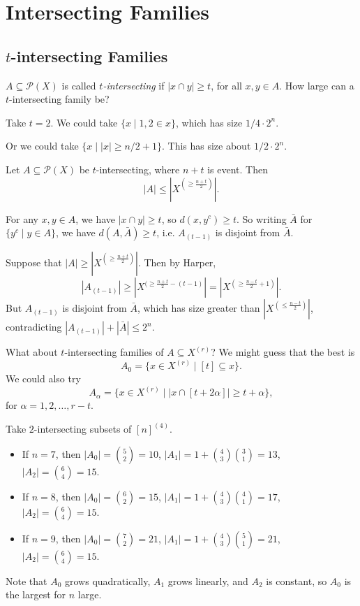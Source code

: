 \documentclass[12pt]{article}
\begin{document}
\newpage

\section{Intersecting Families}%
\label{sec:if}

\subsection{\texorpdfstring{$t$}{t}-intersecting Families}%
\label{sub:tif}

$A \subseteq \mathcal{P}(X)$ is called \emph{$t$-intersecting} if $|x \cap y| \geq t$, for all $x, y \in A$. How large can a $t$-intersecting family be?

\begin{exbox}
Take $t = 2$. We could take $\{x \mid 1, 2 \in x\}$, which has size $1/4 \cdot 2^{n}$.

Or we could take $\{x \mid |x| \geq n/2 + 1\}$. This has size about $1/2 \cdot 2^{n}$.
\end{exbox}

\begin{theorem}
	Let $A \subseteq \mathcal{P}(X)$ be $t$-intersecting, where $n + t$ is event. Then
	\[
	|A| \leq \left| X^{(\geq \frac{n+t}{2})} \right|.
	\]
\end{theorem}

\begin{proofbox}
	For any $x, y \in A$, we have $|x \cap y| \geq t$, so $d(x, y^{c}) \geq t$. So writing $\bar A$ for $\{y^{c} \mid y \in A\}$, we have $d(A, \bar A) \geq t$, i.e. $A_{(t - 1)}$ is disjoint from $\bar A$.

	Suppose that $|A| \geq |X^{(\geq \frac{n+t}{2})}|$. Then by Harper,
	\[
	|A_{(t-1)}| \geq |X^{(\geq \frac{n+t}{2} - (t - 1)}| = |X^{(\geq \frac{n-t}{2} + 1)}|.
	\]
	But $A_{(t-1)}$ is disjoint from $\bar A$, which has size greater than $|X^{(\leq \frac{n-t}{2})}|$, contradicting $|A_{(t-1)}| + |\bar A|\leq 2^{n}$.
\end{proofbox}

What about $t$-intersecting families of $A \subseteq X^{(r)}$? We might guess that the best is
\[
	A_0 = \{x \in X^{(r)} \mid [t] \subseteq x\}.
\]
We could also try
\[
	A_\alpha = \{x \in X^{(r)} \mid |x \cap [t + 2\alpha]| \geq t + \alpha\},
\]
for $\alpha = 1, 2, \ldots, r - t$.
\begin{exbox}
	Take $2$-intersecting subsets of $[n]^{(4)}$.
	\begin{itemize}
		\item If $n = 7$, then $|A_0| = \binom 52 = 10$, $|A_1| = 1 + \binom 43 \binom 31 = 13$, $|A_2| = \binom 64 = 15$.
		\item If $n = 8$, then $|A_0| = \binom 62 = 15$, $|A_1| = 1 + \binom 43 \binom 41 = 17$, $|A_2| = \binom 64 = 15$.
		\item If $n = 9$, then $|A_0| = \binom 72 = 21$, $|A_1| = 1 + \binom 43 \binom 51 = 21$, $|A_2| = \binom 64 = 15$.
	\end{itemize}
	Note that $A_0$ grows quadratically, $A_1$ grows linearly, and $A_2$ is constant, so $A_0$ is the largest for $n$ large.
\end{exbox}
\end{document}
